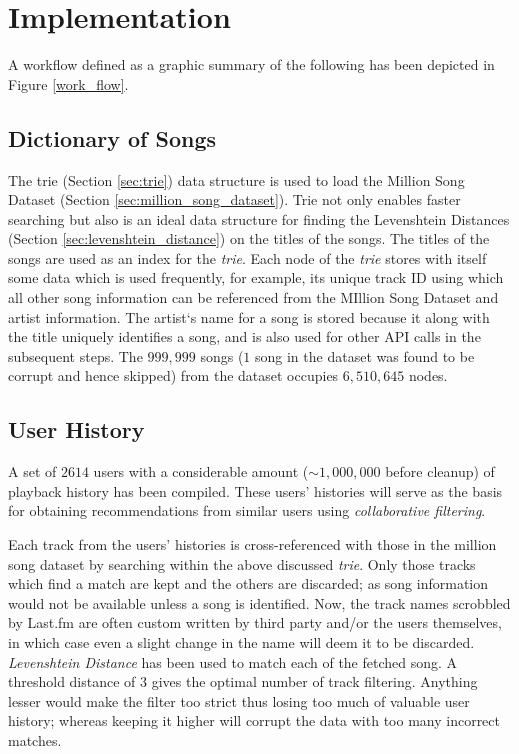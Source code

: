 \chapter{Implementation}
	A workflow defined as a graphic summary of the following has been depicted in Figure \ref{work_flow}.

	\section{Dictionary of Songs}
		The trie (Section \ref{sec:trie}) data structure is used to load the Million Song Dataset (Section \ref{sec:million_song_dataset}). Trie not only enables faster searching but also is an ideal data structure for finding the Levenshtein Distances (Section \ref{sec:levenshtein_distance}) on the titles of the songs. The titles of the songs are used as an index for the \emph{trie}. Each node of the \emph{trie} stores with itself some data which is used frequently, for example, its unique track ID using which all other song information can be referenced from the MIllion Song Dataset and artist information. The artist`s name for a song is stored because it along with the title uniquely identifies a song, and is also used for other API calls in the subsequent steps. The \(999,999\) songs (\(1\) song in the dataset was found to be corrupt and hence skipped) from the dataset occupies \(6,510,645\) nodes.
	
	\section{User History}
		A set of \(2614\) users with a considerable amount ($\sim$\(1,000,000\) before cleanup) of playback history has been compiled. These users' histories will serve as the basis for obtaining recommendations from similar users using \emph{collaborative filtering}.
		
		Each track from the users' histories is cross-referenced with those in the million song dataset by searching within the above discussed \emph{trie}. Only those tracks which find a match are kept and the others are discarded; as song information would not be available unless a song is identified. Now, the track names scrobbled by Last.fm are often custom written by third party and/or the users themselves, in which case even a slight change in the name will deem it to be discarded. \emph{Levenshtein Distance} has been used to match each of the fetched song. A threshold distance of \(3\) gives the optimal number of track filtering. Anything lesser would make the filter too strict thus losing too much of valuable user history; whereas keeping it higher will corrupt the data with too many incorrect matches.

